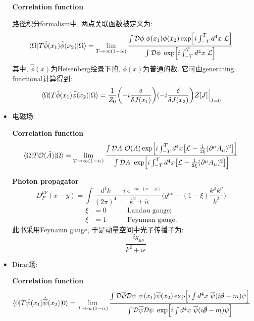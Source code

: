 \begin{itemize}
        \textbf{Correlation function}

        路径积分formalism中, 两点关联函数被定义为:
        \begin{equation*}
          \langle \Omega|T\hat{\phi}(x_1)\hat{\phi}(x_2)|\Omega \rangle = \lim_{T\rightarrow \infty(1-i\epsilon)}\frac{\int \mathcal{D}\phi\ \phi(x_1)\phi(x_2)\exp\Bigl[i\int_{-T}^{T}d^4x\ \mathcal{L}\Bigr]}{\int \mathcal{D}\phi\ \exp\Bigl[i\int_{-T}^{T}d^4x\ \mathcal{L}\Bigr]}
        \end{equation*}
        其中, $\hat{\phi}(x)$为Heisenberg绘景下的, $\phi(x)$为普通的数. 它可由generating functional计算得到:
        \begin{equation*}
          \langle \Omega|T\hat{\phi}(x_1)\hat{\phi}(x_2)|\Omega \rangle = \frac{1}{Z_0}\biggl(-i\frac{\delta}{\delta J(x_1)}\biggr)(-i\frac{\delta}{\delta J(x_2)}\biggr)Z[J]\Bigl| _{J=0}
        \end{equation*}
  \item 电磁场:

        \textbf{Correlation function}
        \begin{equation*}
          \langle \Omega|T \mathcal{O}(\hat{A})|\Omega \rangle = \lim_{T\rightarrow \infty(1-i\epsilon)}\frac{\int \mathcal{D}A\ \mathcal{O}(A)\exp\Bigl[i\int_{-T}^{T}d^4x \bigl[\mathcal{L} - \frac{1}{2\xi}(\partial^{\mu}A_\mu)^2\bigr]\Bigr]}{\int \mathcal{D}A\ \exp\Bigl[i\int_{-T}^{T}d^4x \bigl[\mathcal{L} - \frac{1}{2\xi}(\partial^{\mu}A_\mu)^2\bigr]\Bigr]}
        \end{equation*}

        \textbf{Photon propagator}
        \begin{equation*}
          D^{\mu\nu}_F(x-y) = \int \frac{d^4k}{(2\pi)^4} \frac{-i\ e^{-ik\cdot(x-y)}}{k^2+i\epsilon}\biggl(g^{\mu\nu}-(1-\xi)\frac{k^\mu k^\nu}{k^2}\biggr)
        \end{equation*}
        \begin{align*}
          \xi & = 0\qquad\quad\text{Landau gauge};  \\
          \xi & = 1\qquad\quad\text{Feynman gauge}.
        \end{align*}
        此书采用Feynamn gauge, 于是动量空间中光子传播子为:
        \begin{equation*}
          = \frac{-ig_{\mu\nu}}{k^2 + i\epsilon}
        \end{equation*}
  \item Dirac场:

        \textbf{Correlation function}
        \begin{equation*}
          \langle 0|T\hat{\psi}(x_1)\hat{\overline{\psi}}(x_2)|0 \rangle = \lim_{T\rightarrow \infty(1-i\epsilon)}\frac{\int \mathcal{D}\overline{\psi} \mathcal{D}\psi\ \psi(x_1)\overline{\psi}(x_2) \exp\Bigl[i\int d^4x\ \overline{\psi}(i\cancel{\partial}-m)\psi\Bigr]}{\int \mathcal{D}\overline{\psi} \mathcal{D}\psi\ \exp\Bigl[i\int d^4x\ \overline{\psi}(i\cancel{\partial}-m)\psi\Bigr]}
        \end{equation*}


\end{itemize}
